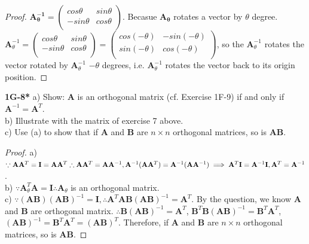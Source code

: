 \documentclass{article}
\begin{document}
%
%
\begin{proof}
$\mathbf{A_{\theta}^{-1}} = \begin{pmatrix}
cos\theta & sin\theta \\
-sin\theta & cos\theta \\
\end{pmatrix}
$. Becasue $\mathbf{A_{\theta}}$ rotates a vector by $\theta$ degree. $\mathbf{A}_{\theta}^{-1} = \begin{pmatrix}
cos\theta & sin\theta \\
-sin\theta & cos\theta \\
\end{pmatrix}
=
\begin{pmatrix}
cos(-\theta) & -sin(-\theta) \\
sin(-\theta) & cos(-\theta) \\
\end{pmatrix}
$, so the $\mathbf{A}_{\theta}^{-1}$ rotates the vector rotated by $\mathbf{A}_{\theta}^{-1}$ $-\theta$ degrees, i.e. $\mathbf{A}_{\theta}^{-1}$ rotates the vector back to its origin position.
\end{proof}
%
%
\textbf{1G-8*} a) Show: $\mathbf{A}$ is an orthogonal matrix (cf. Exercise 1F-9) if and only if $\mathbf{A}^{-1} = \mathbf{A}^T$.
\\ b) Illustrate with the matrix of exercise 7 above.
\\ c) Use (a) to show that if $\mathbf{A}$ and $\mathbf{B}$ are $n \times n$ orthogonal matrices, so is $\mathbf{AB}$.
%
%
\begin{proof}
a) $\because \mathbf{A}\mathbf{A}^T = \mathbf{I} = \mathbf{A}\mathbf{A}^T
\\ \therefore \mathbf{A}\mathbf{A}^T = \mathbf{A}\mathbf{A}^{-1}, \mathbf{A}^{-1}(\mathbf{A}\mathbf{A}^{T}) = \mathbf{A}^{-1}(\mathbf{A}\mathbf{A}^{-1}) \implies \mathbf{A}^{T}\mathbf{I} = \mathbf{A}^{-1}\mathbf{I}, \mathbf{A}^{T} = \mathbf{A}^{-1}$.
\\b) $\because \mathbf{A}_{\theta}^T \mathbf{A} = \mathbf{I} \therefore \mathbf{A}_{\theta}$ is an orthogonal matrix.
\\c) $\because (\mathbf{AB})(\mathbf{AB})^{-1} = \mathbf{I}, \therefore \mathbf{A}^T\mathbf{A}\mathbf{B}(\mathbf{AB})^{-1} = \mathbf{A}^{T}$. By the question, we know $\mathbf{A}$ and $\mathbf{B}$ are orthogonal matrix. $\therefore \mathbf{B}(\mathbf{AB})^{-1} = \mathbf{A}^{T}$, $\mathbf{B}^{T}\mathbf{B}(\mathbf{AB})^{-1} = \mathbf{B}^T\mathbf{A}^{T}$, $(\mathbf{AB})^{-1} = \mathbf{B}^{T}\mathbf{A}^{T} = (\mathbf{AB})^T$. Therefore, if $\mathbf{A}$ and $\mathbf{B}$ are $n \times n$ orthogonal matrices, so is $\mathbf{AB}$.
\end{proof}
\end{document}
